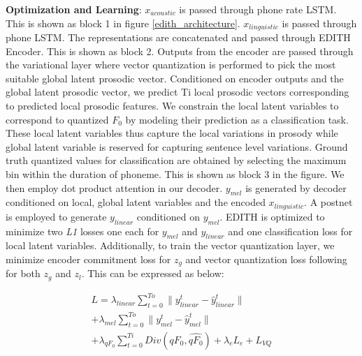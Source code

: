 
\textbf{Optimization and Learning}: $x_{acoustic}$ is passed through phone rate LSTM. This is shown as block 1 in figure \ref{edith_architecture}. $x_{linguistic}$ is passed through phone LSTM. The representations are concatenated and passed through EDITH Encoder. This is shown as block 2. Outputs from the encoder are passed through the variational layer where vector quantization is performed to pick the most suitable global latent prosodic vector. Conditioned on encoder outputs and the global latent prosodic vector, we predict Ti local prosodic vectors corresponding to predicted local prosodic features. 
We constrain the local latent variables to correspond to quantized $F_0$ by modeling their prediction as a classification task. These local latent variables thus capture the local variations in prosody while global latent variable is reserved for capturing sentence level variations. Ground truth quantized values for classification are obtained by selecting the maximum bin within the duration of phoneme. This is shown as block 3 in the figure. We then employ dot product attention in our decoder. \textbf{$y_{mel}$} is generated by decoder conditioned on local, global latent variables and the encoded $x_{linguistic}$. A postnet is employed to generate \textbf{$y_{linear}$} conditioned on \textbf{$y_{mel}$}. EDITH is optimized to minimize two \textit{L1} losses one each for \textbf{$y_{mel}$} and \textbf{$y_{linear}$} and one classification loss for local latent variables. Additionally, to train the vector quantization layer, we minimize encoder commitment loss for $z_g$ and vector quantization loss following \cite{vqvae} for both $z_g$ and $z_l$. This can be expressed as below:

\begin{equation} \label{eq1}
\begin{split}
\textit{L} = \lambda_{linear} \sum_{t=0}^{To} \| y_{linear}^t - \hat{y}_{linear}^t \|  \\
+ \lambda_{mel} \sum_{t=0}^{To} \| y_{mel}^t - \hat{y}_{mel}^t \| \\
+ \lambda_{qF_0} \sum_{t=0}^{Ti} Div(qF_0, \hat{qF_0}) + \lambda_{e} L_{e} + L_{VQ}\\
\end{split}
\end{equation}




